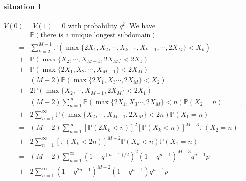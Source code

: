 \documentclass[a4paper,11pt]{article}
\begin{document}
\begin{appendices}
\paragraph*{situation 1}
$V(0) = V(1) = 0$ with probability $q^2$. We have
\begin{equation*}
\begin{split}
  & \mathbb{P}(\text{there is a unique longest subdomain}) \\
= & \sum_{k=2}^{M-1} \mathbb{P}(\max\{2 X_1, X_2, \cdots, X_{k-1}, X_{k+1}, \cdots, 2 X_{M}\} < X_k) \\
+ & \mathbb{P}(\max\{X_2, \cdots, X_{M-1}, 2 X_M\} < 2 X_1) \\
+ & \mathbb{P}(\max\{2 X_1, X_2, \cdots, X_{M-1}\} < 2 X_M) \\
= & (M-2) \mathbb{P}(\max\{2 X_1, X_3 \cdots, 2 X_{M}\} < X_2) \\
+ & 2 \mathbb{P}(\max\{X_2, \cdots, X_{M-1}, 2 X_M\} < 2 X_1) \\
= & (M-2) \sum_{n=1}^{\infty} \mathbb{P}(\max\{2 X_1, X_3 \cdots, 2 X_{M}\} < n) \mathbb{P}(X_2 = n) \\
+ & 2 \sum_{n=1}^{\infty} \mathbb{P}(\max\{X_2, \cdots, X_{M-1}, 2 X_M\} < 2 n) \mathbb{P}(X_1 = n) \\
= & (M-2) \sum_{n=1}^{\infty} [\mathbb{P}(2 X_k < n)]^2 [\mathbb{P}(X_k < n)]^{M-3} \mathbb{P}(X_2 = n) \\
+ & 2 \sum_{n=1}^{\infty} [\mathbb{P}(X_k < 2 n)]^{M-2} \mathbb{P}(X_k < n) \mathbb{P}(X_1 = n) \\
= & (M-2) \sum_{n=1}^{\infty} (1 - q^{(n-1)/2})^2 (1 - q^{n-1})^{M-3} q^{n-1} p \\
+ & 2 \sum_{n=1}^{\infty} (1 - q^{2n-1})^{M-2} (1 - q^{n-1}) q^{n-1} p
\end{split}.
\end{equation*}


\end{appendices}
\end{document}
